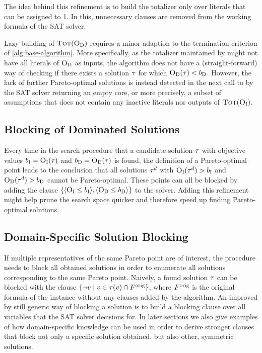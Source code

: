 The idea behind this refinement is to build the totalizer only over literals that can be assigned to 1.
In this, unnecessary clauses are removed from the working formula of the SAT solver.

Lazy building of $\textsc{Tot}(\textsc{O}_{\text{D}})$ requires a minor adaption to the termination criterion of \cref{alg:base-algorithm}.
More specifically, as the totalizer maintained by \Simpr{} might not have all literals of $\textsc{O}_{\text{D}}$ as inputs, the algorithm does not have a (straight-forward) way of checking if there exists a solution $\tau$ for which $\textsc{O}_{\text{D}}(\tau) < b_{\text{D}}$.
However, the lack of further Pareto-optimal solutions is instead detected in the next call to \Min{} by the SAT solver returning an empty core, or more precisely, a subset of assumptions that does not contain any inactive literals nor outputs of $\textsc{Tot}(\textsc{O}_{\text{I}})$.

\subsection{Blocking of Dominated Solutions}

Every time in the search procedure that a candidate solution $\tau$ with objective values $b_{\text{I}} = \textsc{O}_{\text{I}}(\tau)$ and $b_{\text{D}} = \textsc{O}_{\text{D}}(\tau)$ is found, the definition of a Pareto-optimal point leads to the conclusion that all solutions $\tau^d$ with $\textsc{O}_{\text{I}}(\tau^d) > b_{\text{I}}$ and $\textsc{O}_{\text{D}}(\tau^d) > b_{\text{D}}$ cannot be Pareto-optimal.
These points can all be blocked by adding the clause $\{ \langle \textsc{O}_{\text{I}} \leq b_{\text{I}} \rangle, \langle \textsc{O}_{\text{D}} \leq b_{\text{D}} \rangle \}$ to the solver.
Adding this refinement might help prune the search space quicker and therefore speed up finding Pareto-optimal solutions.

\subsection{Domain-Specific Solution Blocking}

If multiple representatives of the same Pareto point are of interest, the procedure \E{} needs to block all obtained solutions in order to enumerate all solutions corresponding to the same Pareto point. 
Naively, a found solution $\tau$ can be blocked with the clause $\{ \lnot v \mid v \in \tau(v) \cap F^\text{orig} \}$, where $F^\text{orig}$ is the original formula of the instance without any clauses added by the algorithm.
An improved by still generic way of blocking a solution is to build a blocking clause over all variables that the SAT solver decisions for. 
In later sections we also give examples of how domain-specific knowledge can be used in order to derive stronger clauses that block not only a specific solution obtained, but also other, symmetric solutions.

